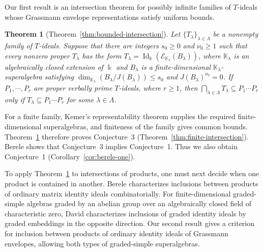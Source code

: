 \documentclass[11pt,reqno]{amsart}
\newtheorem{maintheorem}{Theorem}
\newcommand{\kk}{\Bbbk}
\newcommand{\KK}{\mathbb{K}}
\newcommand{\F}{\mathcal F}
\newcommand{\E}{\mathcal E}
\newcommand{\Id}{\operatorname{Id}}
\theoremstyle{definition}
\theoremstyle{remark}
\numberwithin{equation}{section}
\begin{document}
Our first result is an intersection theorem for possibly
infinite families of $T$-ideals whose Grassmann envelope
representations satisfy uniform bounds.



\begin{maintheorem}[Theorem~\ref{thm:bounded-intersection}]
\label{main:intersection}
Let $\{T_\lambda\}_{\lambda\in\Lambda}$ be a nonempty
family of $T$-ideals. Suppose that there are integers
$s_0\geq0$ and $\nu_0\geq1$ such that every nonzero
proper $T_\lambda$ has the form
$T_\lambda=\Id_{\kk}(\E_{\KK_\lambda}(B_\lambda))$,
where $\KK_\lambda$ is an algebraically closed extension
of $\kk$ and $B_\lambda$ is a finite-dimensional
$\KK_\lambda$-superalgebra satisfying
$\dim_{\KK_\lambda}(B_\lambda/J(B_\lambda))\leq s_0$
and $J(B_\lambda)^{\nu_0}=0$.
If $P_1,\cdots,P_r$ are proper verbally prime
$T$-ideals, where $r\geq1$, then
$\bigcap_{\lambda\in\Lambda}T_\lambda
\subseteq P_1\cdots P_r$ only if
$T_\lambda\subseteq P_1\cdots P_r$
for some $\lambda\in\Lambda$.
\end{maintheorem}

For a finite family, Kemer's representability theorem \cite{Kemer1987}  supplies
the required finite-dimensional superalgebras, and finiteness
of the family gives common bounds. Theorem~\ref{main:intersection}
therefore proves Conjecture~3
(Theorem~\ref{thm:finite-intersection}).
Berele \cite[Corollary~2.4]{Berele2012} shows that
Conjecture~3 implies Conjecture~1.
Thus we also obtain Conjecture~1
(Corollary~\ref{cor:berele-one}).

To apply Theorem~\ref{main:intersection} to intersections of
products, one must next decide when one product is contained
in another.
Berele \cite{Berele2012} characterizes inclusions
between products of ordinary matrix identity ideals
combinatorially. For finite-dimensional graded-simple
algebras graded
by an abelian group over an algebraically closed
field of characteristic zero, David \cite{David2012}
characterizes inclusions of graded identity ideals by
graded embeddings in the opposite direction.
Our second result gives a criterion  for  inclusion between  products
of ordinary identity ideals of Grassmann envelopes, allowing
both types of graded-simple superalgebras.
\end{document}
